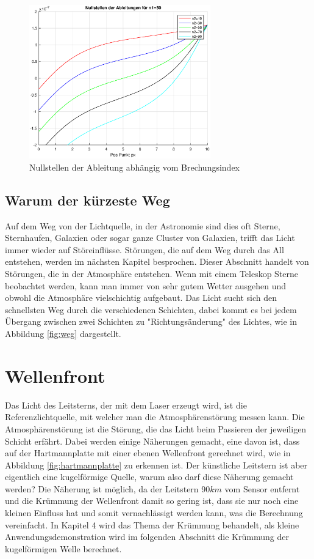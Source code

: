 \begin{refsection}
\begin{figure}
  \centering
  \includegraphics[width=0.7\textwidth]{adaptiv/images/Nullstellen}
  \caption{Nullstellen der Ableitung abhängig vom Brechungsindex}
  \label{fig:nullstelle}
\end{figure}

\subsection{Warum der kürzeste Weg}
Auf dem Weg von der Lichtquelle, in der Astronomie sind dies oft Sterne, Sternhaufen, Galaxien oder sogar ganze Cluster von Galaxien, trifft das Licht immer wieder auf Störeinflüsse. Störungen, die auf dem Weg durch das All entstehen, werden im nächsten Kapitel besprochen. Dieser Abschnitt handelt von Störungen, die in der Atmosphäre entstehen. Wenn mit einem Teleskop Sterne beobachtet werden, kann man immer von sehr gutem Wetter ausgehen und obwohl die Atmosphäre vielschichtig aufgebaut. Das Licht sucht sich den schnellsten Weg durch die verschiedenen Schichten, dabei kommt es bei jedem Übergang zwischen zwei Schichten zu "Richtungsänderung" des Lichtes, wie in Abbildung \ref{fig:weg} dargestellt.

\section{Wellenfront}
Das Licht des Leitsterns, der mit dem Laser erzeugt wird, ist die Referenzlichtquelle, mit welcher man die Atmosphärenstörung messen kann. Die Atmosphärenstörung ist die Störung, die das Licht beim Passieren der jeweiligen Schicht erfährt. Dabei werden einige Näherungen gemacht, eine davon ist, dass auf der Hartmannplatte mit einer ebenen Wellenfront gerechnet wird, wie in Abbildung \ref{fig:hartmannplatte} zu erkennen ist. Der künstliche Leitstern ist aber eigentlich eine kugelförmige Quelle, warum also darf diese Näherung gemacht werden? Die Näherung ist möglich, da der Leitstern 90$km$ vom Sensor entfernt und die Krümmung der Wellenfront damit so gering ist, dass sie nur noch eine kleinen Einfluss hat und somit vernachlässigt werden kann, was die Berechnung vereinfacht. In Kapitel 4 wird das Thema der Krümmung behandelt, als kleine Anwendungsdemonstration wird im folgenden Abschnitt die Krümmung der kugelförmigen Welle berechnet.


\end{refsection}
